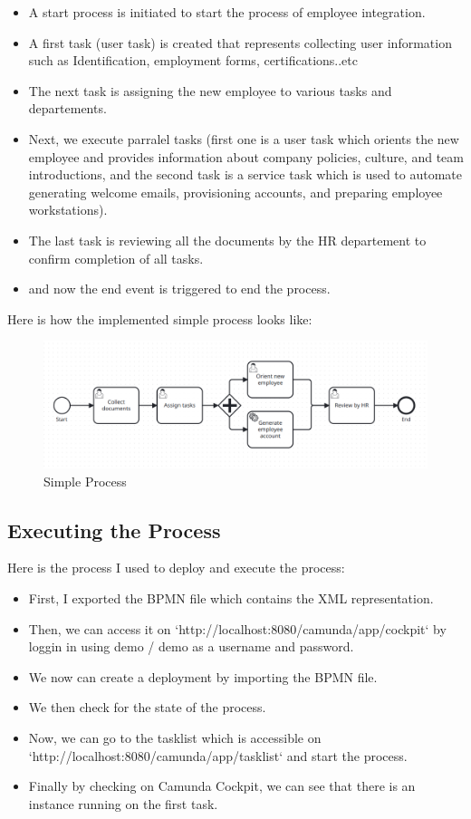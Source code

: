 \documentclass[12pt]{article}
\begin{document}
{\begin{itemize}
  \item A start process is initiated to start the process of employee integration.
  \item A first task (user task) is created that represents collecting user information such as Identification, employment forms, certifications..etc
  \item The next task is assigning the new employee to various tasks and departements.
  \item Next, we execute parralel tasks (first one is a user task which orients the new employee and provides information about company policies, culture, and team introductions, and the second task is a service task which is used to automate generating welcome emails, provisioning accounts, and preparing employee workstations).
  \item The last task is reviewing all the documents by the HR departement to confirm completion of all tasks.
  \item and now the end event is triggered to end the process.
\end{itemize}

\pagebreak

Here is how the implemented simple process looks like:

\begin{figure}[h]
    \centering
    \includegraphics[width=.90\linewidth]{simple_process.png}
    \caption{Simple Process}
    \label{fig:simple_process}
\end{figure}

  \subsection{Executing the Process}

Here is the process I used to deploy and execute the process:

\begin{itemize}
  \item First, I exported the BPMN file which contains the XML representation.
  \item Then, we can access it on `http://localhost:8080/camunda/app/cockpit` by loggin in using demo / demo as a username and password.
  \item We now can create a deployment by importing the BPMN file.
  \item We then check for the state of the process.
  \item Now, we can go to the tasklist which is accessible on `http://localhost:8080/camunda/app/tasklist` and start the process.
  \item Finally by checking on Camunda Cockpit, we can see that there is an instance running on the first task.
\end{itemize}

}
\end{document}
